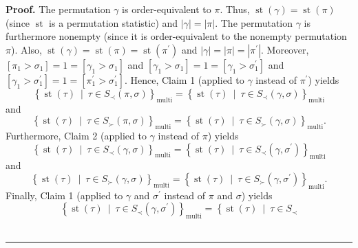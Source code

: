 \documentclass[numbers=enddot,12pt,final,onecolumn,notitlepage]{scrartcl}%
\theoremstyle{definition}
\newenvironment{proof}[1][Proof]{\noindent\textbf{#1.} }{\ \rule{0.5em}{0.5em}}
\begin{document}
\begin{proof}
The permutation $\gamma$ is order-equivalent to $\pi$. Thus,
$\operatorname*{st}\left(  \gamma\right)  =\operatorname*{st}\left(
\pi\right)  $ (since $\operatorname*{st}$ is a permutation statistic) and
$\left\vert \gamma\right\vert =\left\vert \pi\right\vert $. The permutation
$\gamma$ is furthermore nonempty (since it is order-equivalent to the nonempty
permutation $\pi$). Also, $\operatorname*{st}\left(  \gamma\right)
=\operatorname*{st}\left(  \pi\right)  =\operatorname*{st}\left(  \pi^{\prime
}\right)  $ and $\left\vert \gamma\right\vert =\left\vert \pi\right\vert
=\left\vert \pi^{\prime}\right\vert $. Moreover, $\left[  \pi_{1}>\sigma
_{1}\right]  =1=\left[  \gamma_{1}>\sigma_{1}\right]  $ and $\left[
\gamma_{1}>\sigma_{1}\right]  =1=\left[  \gamma_{1}>\sigma_{1}^{\prime
}\right]  $ and
$\left[  \gamma_{1}>\sigma^{\prime}_{1}\right]  =1=\left[  \pi
_{1}^{\prime}>\sigma_{1}^{\prime}\right]  $. Hence, Claim 1 (applied to
$\gamma$ instead of $\pi^{\prime}$) yields%
\[
\left\{  \operatorname*{st}\left(  \tau\right)  \ \mid\ \tau\in S_{\prec
}\left(  \pi,\sigma\right)  \right\}  _{\operatorname*{multi}}=\left\{
\operatorname*{st}\left(  \tau\right)  \ \mid\ \tau\in S_{\prec}\left(
\gamma,\sigma\right)  \right\}  _{\operatorname*{multi}}%
\]
and%
\begin{equation}
\left\{  \operatorname*{st}\left(  \tau\right)  \ \mid\ \tau\in S_{\succ
}\left(  \pi,\sigma\right)  \right\}  _{\operatorname*{multi}}=\left\{
\operatorname*{st}\left(  \tau\right)  \ \mid\ \tau\in S_{\succ}\left(
\gamma,\sigma\right)  \right\}  _{\operatorname*{multi}}.\nonumber
\end{equation}
Furthermore, Claim 2 (applied to $\gamma$ instead of $\pi$) yields%
\[
\left\{  \operatorname*{st}\left(  \tau\right)  \ \mid\ \tau\in S_{\prec
}\left(  \gamma,\sigma\right)  \right\}  _{\operatorname*{multi}}=\left\{
\operatorname*{st}\left(  \tau\right)  \ \mid\ \tau\in S_{\prec}\left(
\gamma,\sigma^{\prime}\right)  \right\}  _{\operatorname*{multi}}%
\]
and%
\[
\left\{  \operatorname*{st}\left(  \tau\right)  \ \mid\ \tau\in S_{\succ
}\left(  \gamma,\sigma\right)  \right\}  _{\operatorname*{multi}}=\left\{
\operatorname*{st}\left(  \tau\right)  \ \mid\ \tau\in S_{\succ}\left(
\gamma,\sigma^{\prime}\right)  \right\}  _{\operatorname*{multi}}.
\]
Finally, Claim 1 (applied to $\gamma$ and $\sigma^{\prime}$ instead of $\pi$
and $\sigma$) yields%
\[
\left\{  \operatorname*{st}\left(  \tau\right)  \ \mid\ \tau\in S_{\prec
}\left(  \gamma,\sigma^{\prime}\right)  \right\}  _{\operatorname*{multi}%
}=\left\{  \operatorname*{st}\left(  \tau\right)  \ \mid\ \tau\in S_{\prec
}\]
\end{proof}
\end{document}
